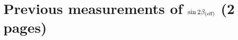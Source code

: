
\section{Previous measurements of \texorpdfstring{$\sin 2\beta_{\mathrm{(eff)}}$}{sin2beta(eff)} (2 pages)}
\label{sec:discussion:sin2betahistory}